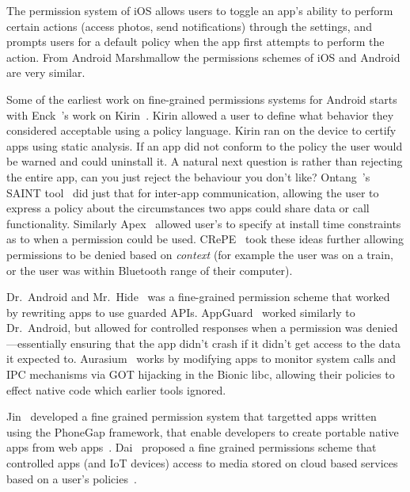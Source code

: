 \documentclass[thesis.tex]{subfiles}
\begin{document}
The permission system of iOS allows users to
toggle an app's ability to perform certain actions (access photos,
send notifications) through the settings, and prompts users for a
default policy when the app first attempts to perform the action.
From Android Marshmallow the permissions schemes of iOS and Android
are very similar.

Some of the earliest work on fine-grained permissions systems for
Android starts with Enck~\etal's work on
Kirin~\cite{enck_lightweight_2009}.  Kirin allowed a user to define
what behavior they considered acceptable using a policy language.
Kirin ran on the device to certify apps using static analysis.  If an
app did not conform to the policy the user would be warned and could
uninstall it.  A natural next question is rather than rejecting the
entire app, can you just reject the behaviour you don't like?
Ontang~\etal's SAINT tool~\cite{ongtang_semantically_2012} did just
that for inter-app communication, allowing the user to express a
policy about the circumstances two apps could share data or call
functionality.  Similarly Apex~\cite{nauman_apex:_2010} allowed user's
to specify at install time constraints as to when a permission could
be used.  
CRePE~\cite{conti_crepe:_2010} took
these ideas further allowing permissions to be denied based on
\emph{context} (for example the user was on a train, or the user was
within Bluetooth range of their computer).

Dr{.}~Android and Mr{.}~Hide~\cite{jeon_dr._2012} was a fine-grained permission
scheme that worked by rewriting apps to use guarded APIs.
AppGuard~\cite{backes_appguard_2013} worked similarly to Dr{.}~Android, but
allowed for controlled responses when a permission was denied---essentially
ensuring that the app didn't crash if it didn't get access to the data it
expected to. Aurasium~\cite{xu_aurasium:_2012} works by modifying apps to
monitor system calls and IPC mechanisms via GOT hijacking in the Bionic libc,
allowing their policies to effect native code which earlier tools ignored.

Jin~\etal{} developed a fine grained permission system that targetted apps
written using the PhoneGap framework, that enable developers to create portable
native apps from web apps~\cite{jin_fine-grained_2015}. Dai~\etal{} proposed a
fine grained permissions scheme that controlled apps (and IoT devices) access to
media stored on cloud based services based on a user's
policies~\cite{dai_who_2017}.
\end{document}
